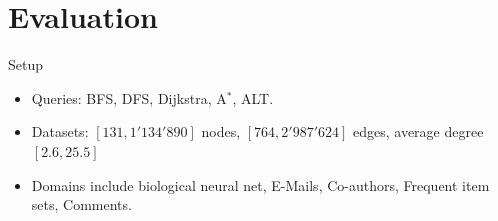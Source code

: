 \documentclass[rgb]{beamer}
\begin{document}
    \section{Evaluation}
        \begin{frame}{Setup}
        \begin{itemize}
         \item Queries: BFS, DFS, Dijkstra, A$^*$, ALT. \\ [1em]       
         \item Datasets: $[131, 1'134'890]$ nodes, $[764, 2'987'624]$ edges, average degree $[2.6, 25.5]$ \\ [1em]
         \item Domains include biological neural net, E-Mails, Co-authors, Frequent item sets, Comments.
        \end{itemize}
        \end{frame}
        
\end{document}
